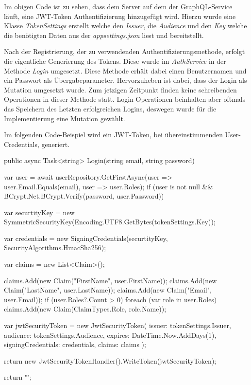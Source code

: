 Im obigen Code ist zu sehen, dass dem Server auf dem der GraphQL-Service läuft, eine JWT-Token Authentifizierung hinzugefügt wird.
Hierzu wurde eine Klasse \textit{TokenSettings} erstellt welche den \textit{Issuer}, die \textit{Audience} und den \textit{Key} welche die benötigten Daten aus der \textit{appsettings.json} liest und bereitstellt.
\newline

Nach der Registrierung, der zu verwendenden Authentifizierungsmethode, erfolgt die eigentliche Generierung des Tokens.
Diese wurde im \textit{AuthService} in der Methode \textit{Login} umgesetzt.
Diese Methode erhält dabei einen Benutzernamen und ein Passwort als Übergabeparameter.
Hervorzuheben ist dabei, dass der Login als Mutation umgesetzt wurde.
Zum jetzigen Zeitpunkt finden keine schreibenden Operationen in dieser Methode statt.
Login-Operationen beinhalten aber oftmals das Speichern des Letzten erfolgreichen Logins, deswegen wurde für die Implementierung eine Mutation gewählt.
\newline

Im folgenden Code-Beispiel wird ein JWT-Token, bei übereinstimmenden User-Credentials, generiert.

\begin{JsCode}
public async Task<string> Login(string email, string password) {

    var user = await userRepository.GetFirstAsync(user => user.Email.Equals(email), user => user.Roles);
    if (user is not null && BCrypt.Net.BCrypt.Verify(password, user.Password)) {
        var securtityKey = new SymmetricSecurityKey(Encoding.UTF8.GetBytes(tokenSettings.Key));

        var credentials = new SigningCredentials(securtityKey, SecurityAlgorithms.HmacSha256);

        var claims = new List<Claim>();

        claims.Add(new Claim("FirstName", user.FirstName));
        claims.Add(new Claim("LastName", user.LastName));
        claims.Add(new Claim("Email", user.Email));
        if (user.Roles?.Count > 0) {
            foreach (var role in user.Roles) {
                claims.Add(new Claim(ClaimTypes.Role, role.Name));
            }
        }

        var jwtSecurityToken = new JwtSecurityToken(
            issuer: tokenSettings.Issuer,
            audience: tokenSettings.Audience,
            expires: DateTime.Now.AddDays(1),
            signingCredentials: credentials,
            claims: claims
        );

        return new JwtSecurityTokenHandler().WriteToken(jwtSecurityToken);
    }

    return "";
}
\end{JsCode}

